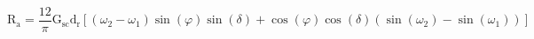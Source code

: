 \documentclass[12pt]{article}
\begin{document}
\begin{displaymath}
\mathrm{R}_{\mathrm{a}}=\frac{12}{\pi} \mathrm{G}_{\mathrm{sc}} \mathrm{d}_{\mathrm{r}}\left[\left(\omega_{2}-\omega_{1}\right) \sin (\varphi) \sin (\delta)+\cos (\varphi) \cos (\delta)\left(\sin \left(\omega_{2}\right)-\sin \left(\omega_{1}\right)\right)\right]
\end{displaymath}
\end{document}
